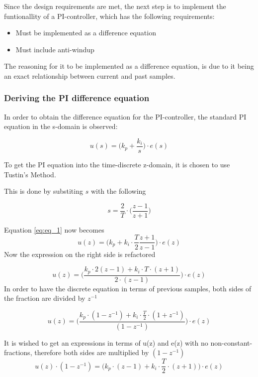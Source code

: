 \documentclass[../../../main]{subfiles}
\begin{document}
Since the design requirements are met, the next step is to implement the funtionallity of a PI-controller, which has the following requirements:
\begin{itemize}
    \item Must be implemented as a difference equation
    \item Must include anti-windup
\end{itemize}
The reasoning for it to be implemented as a difference equation, is due to it being an exact relationship between current and past samples.

\subsubsection{Deriving the PI difference equation}

In order to obtain the difference equation for the PI-controller, the standard PI equation in the s-domain is observed:

\begin{equation}
  u(s) = \Bigg(k_p + \frac{k_i}{s} \Bigg) \cdot e(s) \label{eq:eq_1}
\end{equation}


To get the PI equation into the time-discrete z-domain, it is chosen to use Tustin's Method.

This is done by substiting $s$ with the following

$$
s = \frac{2}{T}\cdot \Bigg( \frac{z-1}{z+1}\Bigg)
$$

Equation \eqref{eq:eq_1} now becomes
$$
  u(z) = \Bigg(k_p + k_i\cdot \frac{T}{2} \frac{z+1}{z-1} \Bigg) \cdot e(z)
$$
Now the expression on the right side is refactored

$$
  u(z) = \Bigg( \frac{k_p \cdot 2(z-1) + k_i \cdot T \cdot (z+1)}{2\cdot (z-1)}\Bigg) \cdot e(z)
$$
In order to have the discrete equation in terms of previous samples, both sides of the fraction are divided by $z^{-1}$

$$
  u(z) = \Bigg( \frac{k_p \cdot(1-z^{-1}) + k_i \cdot \frac{T}{2} \cdot (1+z^{-1}) }{(1-z^{-1})}\Bigg) \cdot e(z)
$$

It is wished to get an expressions in terms of u(z) and e(z) with no non-constant-fractions, therefore both sides are multiplied by $(1 - z^{-1})$
$$
  u(z)\cdot(1 - z^{-1}) = \Bigg( k_p \cdot(z-1) + k_i \cdot \frac{T}{2} \cdot (z+1) \Bigg) \cdot e(z)
$$
\end{document}
